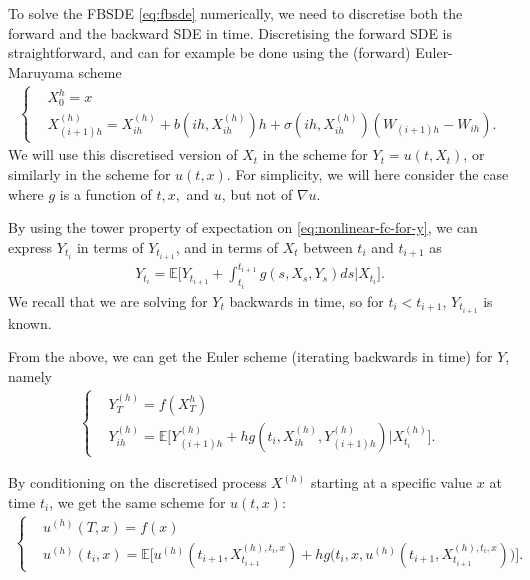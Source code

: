 \documentclass{article}  %
\begin{document}
To solve the FBSDE \autoref{eq:fbsde} numerically, we need to discretise both the forward and the backward SDE in time. Discretising the forward SDE is straightforward, and can for example be done using the (forward) Euler-Maruyama scheme
%
\begin{align} 
    \begin{cases}
    &X_0^{h} = x\\
    &X_{(i+1)h}^{(h)} = X_{ih}^{(h)} + b(ih,X_{ih}^{(h)}) h + \sigma(ih,X_{ih}^{(h)})(W_{(i+1)h}-W_{ih}).
    \end{cases}
\end{align}
%
We will use this discretised version of $X_t$ in the scheme for $Y_t=u(t,X_t)$, or similarly in the scheme for $u(t,x)$. For simplicity, we will here consider the case where $g$ is a function of $t,x,$ and $u$, but not of $\nabla u$.

By using the tower property of expectation on \autoref{eq:nonlinear-fc-for-y}, we can express $Y_{t_i}$ in terms of $Y_{t_{i+1}}$, and in terms of $X_t$ between $t_i$ and $t_{i+1}$ as
%
\begin{align} 
    Y_{t_i} = \mathbb{E}\bigg[ Y_{t_{i+1}} + \int_{t_{i}}^{t_{i+1}}g(s,X_s,Y_s)ds \Big\lvert X_{t_i} \bigg].
\end{align}
%
We recall that we are solving for $Y_t$ backwards in time, so for $t_i < t_{i+1}$, $Y_{t_{i+1}}$ is known.

From the above, we can get the Euler scheme (iterating backwards in time) for $Y$, namely
%
\begin{align} %
    \begin{cases}
    &Y_T^{(h)} = f(X_T^{h})\\
    &Y_{ih}^{(h)} = \mathbb{E}\bigg[ Y_{(i+1)h}^{(h)} + h g(t_i,X_{ih}^{(h)},Y_{(i+1)h}^{(h)}) \Big\lvert X_{t_i}^{(h)} \bigg].
    \end{cases}
\end{align}
%

By conditioning on the discretised process $X^{(h)}$ starting at a specific value $x$ at time $t_i$, we get the same scheme for $u(t,x)$:
%
\begin{align}
    \begin{cases}
    &u^{(h)}(T,x) = f(x)\\
    &u^{(h)}(t_i,x) = \mathbb{E}\bigg[ u^{(h)}(t_{i+1},X^{(h),t_i,x}_{t_{i+1}}) + h g\big( t_i,x,u^{(h)}(t_{i+1},X^{(h),t_i,x}_{t_{i+1}}) \big) \bigg]. 
    \end{cases}
\end{align} 
%
\end{document}
